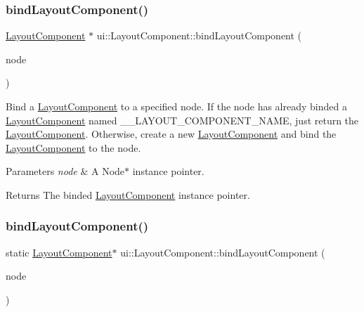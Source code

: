 \subsubsection{\texorpdfstring{bind\+Layout\+Component()}{bindLayoutComponent()}\hspace{0.1cm}{\footnotesize\ttfamily [1/2]}}
{\footnotesize\ttfamily \hyperlink{classui_1_1LayoutComponent}{Layout\+Component} $\ast$ ui\+::\+Layout\+Component\+::bind\+Layout\+Component (\begin{DoxyParamCaption}\item[{\hyperlink{classNode}{Node} $\ast$}]{node }\end{DoxyParamCaption})\hspace{0.3cm}{\ttfamily [static]}}

Bind a \hyperlink{classui_1_1LayoutComponent}{Layout\+Component} to a specified node. If the node has already binded a \hyperlink{classui_1_1LayoutComponent}{Layout\+Component} named \+\_\+\+\_\+\+L\+A\+Y\+O\+U\+T\+\_\+\+C\+O\+M\+P\+O\+N\+E\+N\+T\+\_\+\+N\+A\+ME, just return the \hyperlink{classui_1_1LayoutComponent}{Layout\+Component}. Otherwise, create a new \hyperlink{classui_1_1LayoutComponent}{Layout\+Component} and bind the \hyperlink{classui_1_1LayoutComponent}{Layout\+Component} to the node. 
\begin{DoxyParams}{Parameters}
{\em node} & A Node$\ast$ instance pointer. \\
\hline
\end{DoxyParams}
\begin{DoxyReturn}{Returns}
The binded \hyperlink{classui_1_1LayoutComponent}{Layout\+Component} instance pointer. 
\end{DoxyReturn}
\mbox{\label{classui_1_1LayoutComponent_a60fc7a074d1465aa1403dd320265e7fd}} 
\subsubsection{\texorpdfstring{bind\+Layout\+Component()}{bindLayoutComponent()}\hspace{0.1cm}{\footnotesize\ttfamily [2/2]}}
{\footnotesize\ttfamily static \hyperlink{classui_1_1LayoutComponent}{Layout\+Component}$\ast$ ui\+::\+Layout\+Component\+::bind\+Layout\+Component (\begin{DoxyParamCaption}\item[{\hyperlink{classNode}{Node} $\ast$}]{node }\end{DoxyParamCaption})\hspace{0.3cm}{\ttfamily [static]}}

